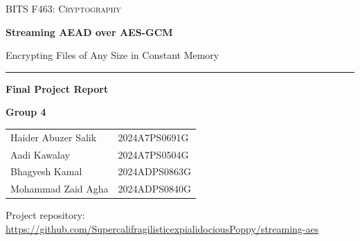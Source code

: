 \documentclass[11pt,a4paper]{article}
\begin{document}
\begin{titlepage}
\centering
\vspace*{2.5cm}
{\large\scshape BITS F463: Cryptography\par}
\vspace{1.2cm}
{\Huge\bfseries\color{navy} Streaming AEAD over AES-GCM\par}
\vspace{0.4cm}
{\Large Encrypting Files of Any Size in Constant Memory\par}
\vspace{1cm}
\rule{0.7\textwidth}{0.4pt}\par
\vspace{1cm}
{\Large\bfseries Final Project Report\par}
\vspace{2cm}
{\large\bfseries Group 4\par}
\vspace{0.4cm}
\begin{tabular}{ll}
Haider Abuzer Salik & 2024A7PS0691G\\
Aadi Kawalay & 2024A7PS0504G\\
Bhagyesh Kamal & 2024ADPS0863G\\
Mohammad Zaid Agha & 2024ADPS0840G
\end{tabular}
\vfill
Project repository:\\
\url{https://github.com/SupercalifragilisticexpialidociousPoppy/streaming-aes}
\end{titlepage}

\begin{abstract}
AES-GCM authenticates a message as one unit, so a safe one-shot decryptor must hold the whole message in memory, and NIST limits a single GCM message to about 64\,GiB. We designed and implemented a chunked file format over AES-256-GCM that encrypts files of any size in constant memory. Each 1\,MiB chunk is a separate GCM call whose nonce encodes the chunk's position and whether it is the last chunk, under a key derived for each file from the master key, a random salt and the whole header (HKDF-SHA256). We also implemented GCM itself, validated against all 47,250 NIST test vectors. Four attacks that move valid chunks (truncation, reordering, replay, splicing) succeed against a naive chunked design and fail against ours; a fifth, IV reuse, breaks GCM itself, and we show how our design makes it practically impossible. The engine uses about 3\,MiB of memory for any file size, against 512\,MiB for one-shot GCM on a 256\,MiB file.
\end{abstract}
\end{document}
